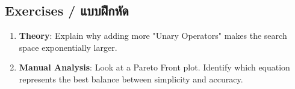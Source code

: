 \subsection{Exercises \quad / \quad \textthai{แบบฝึกหัด}}
\begin{enumerate}
    \item \textbf{Theory}: Explain why adding more "Unary Operators" makes the search space exponentially larger.
    \item \textbf{Manual Analysis}: Look at a Pareto Front plot. Identify which equation represents the best balance between simplicity and accuracy.
\end{enumerate}
